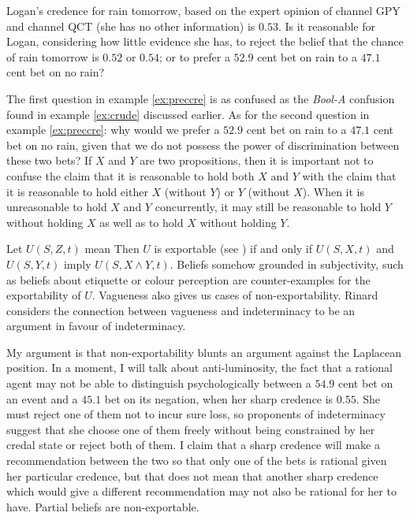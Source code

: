 \documentclass[11pt]{article}
\newcommand{\anderson}[0]{\textit{Bool-A}}
\begin{document}
\begin{quotex}
  \label{ex:preccre} Logan's credence for
  rain tomorrow, based on the expert opinion of channel GPY and
  channel QCT (she has no other information) is $0.53$. Is it
  reasonable for Logan, considering how little evidence she has, to
  reject the belief that the chance of rain tomorrow is $0.52$ or
  $0.54$; or to prefer a $52.9$ cent bet on rain to a $47.1$ cent bet
  on no rain?
\end{quotex}

The first question in example \ref{ex:preccre} is as confused as the
{\anderson} confusion found in example \ref{ex:crude} discussed
earlier. As for the second question in example \ref{ex:preccre}: why
would we prefer a $52.9$ cent bet on rain to a $47.1$ cent bet on no
rain, given that we do not possess the power of discrimination between
these two bets? If $X$ and $Y$ are two propositions, then it is
important not to confuse the claim that it is reasonable to hold both
$X$ and $Y$ with the claim that it is reasonable to hold either $X$
(without $Y$) or $Y$ (without $X$). When it is unreasonable to hold
$X$ and $Y$ concurrently, it may still be reasonable to hold $Y$
without holding $X$ as well as to hold $X$ without holding $Y$.

Let $U(S,Z,t)$ mean  Then $U$ is exportable (see ) if
and only if $U(S,X,t)$ and $U(S,Y,t)$ imply $U(S,X\wedge{}Y,t)$.
Beliefs somehow grounded in subjectivity, such as beliefs about
etiquette or colour perception are counter-examples for the
exportability of $U$. Vagueness also gives us cases of
non-exportability. Rinard considers the connection between vagueness
and indeterminacy to be an argument in favour of indeterminacy.

My argument is that non-exportability blunts an argument against the
Laplacean position. In a moment, I will talk about anti-luminosity,
the fact that a rational agent may not be able to distinguish
psychologically between a $54.9$ cent bet on an event and a $45.1$ bet
on its negation, when her sharp credence is $0.55$. She must reject
one of them not to incur sure loss, so proponents of indeterminacy
suggest that she choose one of them freely without being constrained
by her credal state or reject both of them. I claim that a sharp
credence will make a recommendation between the two so that only one
of the bets is rational given her particular credence, but that does
not mean that another sharp credence which would give a different
recommendation may not also be rational for her to have. Partial
beliefs are non-exportable.
\end{document}
